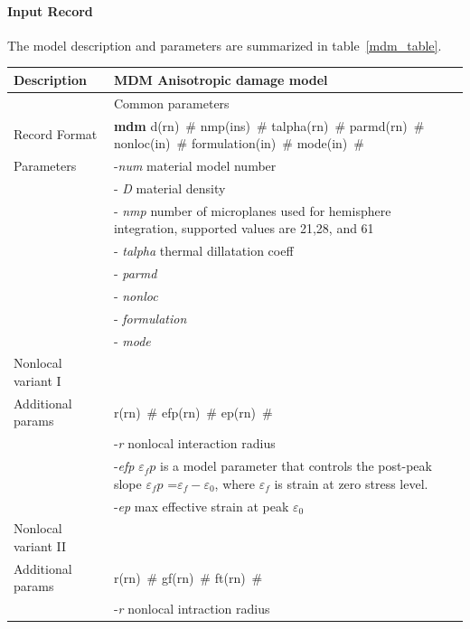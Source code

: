 \documentclass[epsf,a4paper]{article}
\newcommand{\descitem}[1]{{\noindent \bf #1}}
\newcommand{\elemparam}[2]{{{#1\tiny (#2)}~\#}}
\newcommand{\param}[1]{{\it #1}}
\begin{document}
\paragraph{Input Record}
The model description and parameters are summarized
in table~\ref{mdm_table}.

\begin{table}[h]                                                                
\begin{tabular}{|l|p{9cm}|}                                                      
\hline                                                                          
Description & MDM Anisotropic damage model\\
\hline                        
& Common parameters\\
Record Format & \descitem{mdm} \elemparam{d}{rn} \elemparam{nmp}{ins} \elemparam{talpha}{rn}
\elemparam{parmd}{rn}  \elemparam{nonloc}{in}
\elemparam{formulation}{in} \elemparam{mode}{in}\\
Parameters & -\param{num} material model number\\
& - \param{D} material density\\
& - \param{nmp} number of microplanes used for hemisphere integration,
supported values are 21,28, and 61\\
& - \param{talpha}  thermal dillatation coeff\\
& - \param{parmd} \\
& - \param{nonloc} \\
& - \param{formulation}\\
& - \param{mode}\\
\hline
Nonlocal variant I&\\
Additional params &\elemparam{r}{rn} \elemparam{efp}{rn}
\elemparam{ep}{rn} \\
& -\param{r} nonlocal interaction radius\\
& -\param{efp} $\varepsilon_fp$ is a model parameter that controls
the post-peak slope $\varepsilon_fp$ =$\varepsilon_f-\varepsilon_0$,
where $\varepsilon_f$ is strain at zero stress level.\\
& -\param{ep} max effective strain at peak $\varepsilon_0$\\
\hline
Nonlocal variant II&\\
Additional params &\elemparam{r}{rn} \elemparam{gf}{rn}
\elemparam{ft}{rn}\\
& -\param{r} nonlocal intraction radius\\

\end{tabular}
\end{table}
\end{document}
